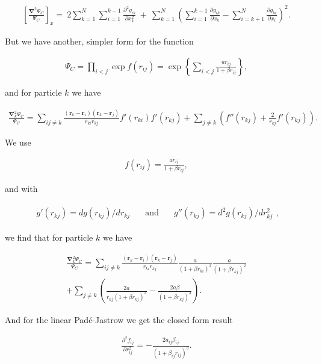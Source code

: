 			\begin{align}
				\left[\frac{\mathbf{\nabla}^{2}\Psi_{C}}{\Psi_{C}}\right]_{x}=\ 2\sum_{k=1}^{N}\sum_{i=1}^{k-1}\frac{\partial^{2}g_{ik}}{\partial x_{k}^{2}}\ +\ \sum_{k=1}^{N}\left(\sum_{i=1}^{k-1}\frac{\partial g_{ik}}{\partial x_{k}}-\sum_{i=k+1}^{N}\frac{\partial g_{ki}}{\partial x_{i}}\right)^{2}.
			\end{align}

			But we have another, simpler form for the function

			\begin{align}
				\Psi_{C}=\prod_{i<j}\exp f(r_{ij})=\exp\left\{ \sum_{i<j}\frac{ar_{ij}}{1+\beta r_{ij}}\right\},
			\end{align}

			and for particle $k$ we have

			\begin{align}
				\frac{\mathbf{\nabla}_{k}^{2}\Psi_{C}}{\Psi_{C}}=\sum_{ij\ne k}\frac{(\mathbf{r}_{k}-\mathbf{r}_{i})(\mathbf{r}_{k}-\mathbf{r}_{j})}{r_{ki}r_{kj}}f'(r_{ki})f'(r_{kj})+\sum_{j\ne k}\left(f''(r_{kj})+\frac{2}{r_{kj}}f'(r_{kj})\right).
			\end{align}

			We use

			\begin{align}
				f(r_{ij})=\frac{ar_{ij}}{1+\beta r_{ij}},
			\end{align}

			and with

			\begin{align}
				\begin{array}{ccc}
				g'(r_{kj})=dg(r_{kj})/dr_{kj} & \quad\mbox{and}\quad & g''(r_{kj})=d^{2}g(r_{kj})/dr_{kj}^{2}\end{array},
			\end{align}

			we find that for particle $k$ we have

			\begin{eqnarray*}
				\frac{\mathbf{\nabla}_{k}^{2}\Psi_{C}}{\Psi_{C}}=\sum_{ij\ne k}\frac{(\mathbf{r}_{k}-\mathbf{r}_{i})(\mathbf{r}_{k}-\mathbf{r}_{j})}{r_{ki}r_{kj}}\frac{a}{(1+\beta r_{ki})^{2}}\frac{a}{(1+\beta r_{kj})^{2}} \\
				+\sum_{j\ne k}\left(\frac{2a}{r_{kj}(1+\beta r_{kj})^{2}}-\frac{2a\beta}{(1+\beta r_{kj})^{3}}\right).
			\end{eqnarray*}

			And for the linear Padé-Jastrow we get the closed form result

			\begin{align}
				\frac{\partial^{2}f_{ij}}{\partial r_{ij}^{2}}=-\frac{2a_{ij}\beta_{ij}}{\left(1+\beta_{ij}r_{ij}\right)^{3}}.
			\end{align}
